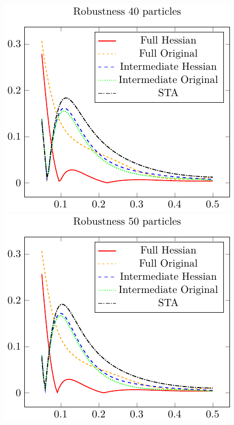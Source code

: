 \includegraphics{./gfx/robustness_np40_nlambda5.pdf}
\includegraphics{./gfx/robustness_np50_nlambda5.pdf}
